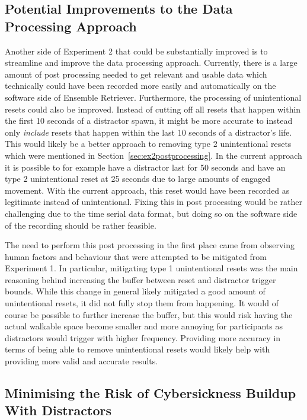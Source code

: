 \subsection{Potential Improvements to the Data Processing Approach}\label{sec:improvingDataRecording}
Another side of Experiment 2 that could be substantially improved is to streamline and improve the data processing approach. Currently, there is a large amount of post processing needed to get relevant and usable data which technically could have been recorded more easily and automatically on the software side of Ensemble Retriever. Furthermore, the processing of unintentional resets could also be improved. Instead of cutting off all resets that happen within the first 10 seconds of a distractor spawn, it might be more accurate to instead only \emph{include} resets that happen within the last 10 seconds of a distractor's life. This would likely be a better approach to removing type 2 unintentional resets which were mentioned in Section~\ref{sec:ex2postprocessing}. In the current approach it is possible to for example have a distractor last for 50 seconds and have an type 2 unintentional reset at 25 seconds due to large amounts of engaged movement. With the current approach, this reset would have been recorded as legitimate instead of unintentional. Fixing this in post processing would be rather challenging due to the time serial data format, but doing so on the software side of the recording should be rather feasible. 

The need to perform this post processing in the first place came from observing human factors and behaviour that were attempted to be mitigated from Experiment 1. In particular, mitigating type 1 unintentional resets was the main reasoning behind increasing the buffer between reset and distractor trigger bounds. While this change in general likely mitigated a good amount of unintentional resets, it did not fully stop them from happening. It would of course be possible to further increase the buffer, but this would risk having the actual walkable space become smaller and more annoying for participants as distractors would trigger with higher frequency. Providing more accuracy in terms of being able to remove unintentional resets would likely help with providing more valid and accurate results. 

\subsection{Minimising the Risk of Cybersickness Buildup With Distractors}\label{sec:ex2MinimisingCybersickness}

